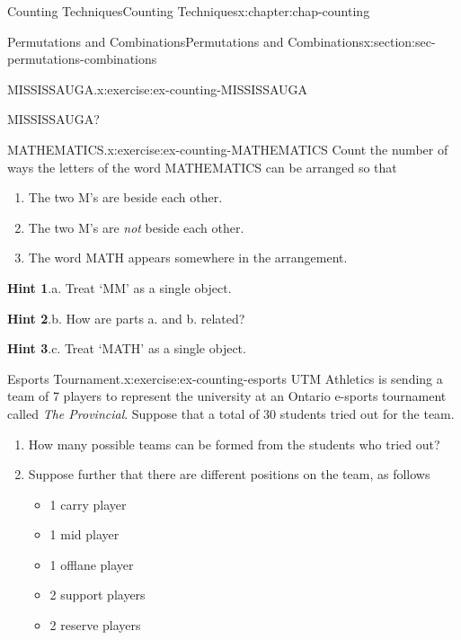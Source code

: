 \documentclass[oneside,10pt,]{book}
\newcommand{\blocktitlefont}{\relax}
\numberwithin{equation}{section}
\begin{document}
\begin{chapterptx}{Counting Techniques}{}{Counting Techniques}{}{}{x:chapter:chap-counting}
\begin{sectionptx}{Permutations and Combinations}{}{Permutations and Combinations}{}{}{x:section:sec-permutations-combinations}
\begin{inlineexercise}{MISSISSAUGA.}{x:exercise:ex-counting-MISSISSAUGA}
\begin{sidebyside}{1}{0.375}{0.375}{0}%
\begin{sbspanel}{0.25}%
MISSISSAUGA?%
\end{sbspanel}%
\end{sidebyside}%
\end{inlineexercise}%
\begin{inlineexercise}{MATHEMATICS.}{x:exercise:ex-counting-MATHEMATICS}%
Count the number of ways the letters of the word MATHEMATICS can be arranged so that%
\begin{enumerate}[label=(\alph*)]
\item{}The two M's are beside each other.%
\item{}The two M's are \emph{not} beside each other.%
\item{}The word MATH appears somewhere in the arrangement.%
\end{enumerate}
%
\par\smallskip%
\noindent\textbf{\blocktitlefont Hint 1}.\hypertarget{g:hint:id524490}{}\quad{}a. Treat `MM' as a single object.%
\par\smallskip%
\noindent\textbf{\blocktitlefont Hint 2}.\hypertarget{g:hint:id524476}{}\quad{}b. How are parts a. and b. related?%
\par\smallskip%
\noindent\textbf{\blocktitlefont Hint 3}.\hypertarget{g:hint:id524489}{}\quad{}c. Treat `MATH' as a single object.%
\end{inlineexercise}%
\begin{inlineexercise}{Esports Tournament.}{x:exercise:ex-counting-esports}%
UTM Athletics is sending a team of 7 players to represent the university at an Ontario e-sports tournament called \emph{The Provincial}. Suppose that a total of 30 students tried out for the team.%
\begin{enumerate}[label=(\alph*)]
\item{}How many possible teams can be formed from the students who tried out?%
\item{}Suppose further that there are different positions on the team, as follows%
\begin{itemize}[label=\textbullet]
\item{}1 carry player%
\item{}1 mid player%
\item{}1 offlane player%
\item{}2 support players%
\item{}2 reserve players%
\end{itemize}

\end{enumerate}
\end{inlineexercise}
\end{sectionptx}
\end{chapterptx}
\end{document}
